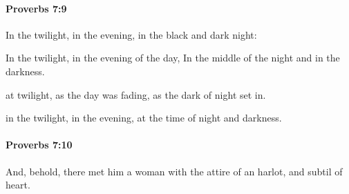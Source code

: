 		\paragraph{Proverbs 7:9} %
			\label{PROVERBS-7-9}

			In the twilight, in the evening, in the black and dark night:

			\begin{versebox}
					\item[BHS] 
					\item[ASV] In the twilight, in the evening of the day, In the middle of the night and in the darkness.
					\item[NIV] at twilight, as the day was fading, as the dark of night set in.
					\item[NRSV] in the twilight, in the evening, at the time of night and darkness.
			\end{versebox}

		\paragraph{Proverbs 7:10} %
			\label{PROVERBS-7-10}

			And, behold, there met him a woman with the attire of an harlot, and subtil of heart.


